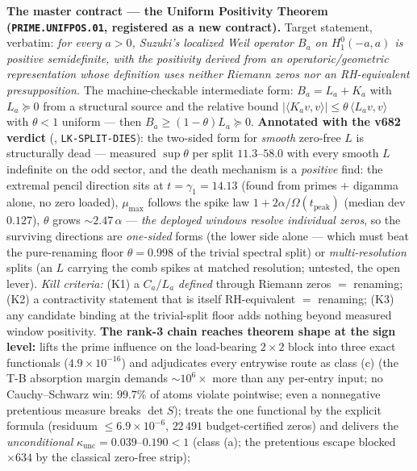 \textbf{The master contract --- the Uniform Positivity Theorem
(\texttt{PRIME.UNIFPOS.01}, registered as a new contract).}  Target
statement, verbatim: \emph{for every $a>0$, Suzuki's localized Weil
operator $B_a$ on $H^0_1(-a,a)$ is positive semidefinite, with the
positivity derived from an operatoric/geometric representation whose
definition uses neither Riemann zeros nor an RH-equivalent
presupposition.}  The machine-checkable intermediate form: $B_a=L_a
+K_a$ with $L_a\succeq0$ from a structural source and the relative
bound $|\langle K_av,v\rangle|\le\theta\,\langle L_av,v\rangle$ with
$\theta<1$ uniform --- then $B_a\ge(1-\theta)L_a\succeq0$.
\textbf{Annotated with the v682 verdict}
(, \texttt{LK-SPLIT-DIES}): the
two-sided form for \emph{smooth} zero-free $L$ is structurally dead
--- measured $\sup\theta$ per split $11.3$--$58.0$ with every smooth
$L$ indefinite on the odd sector, and the death mechanism is a
\emph{positive} find: the extremal pencil direction sits at
$t=\gamma_1=14.13$ (found from primes $+$ digamma alone, no zero
loaded), $\mu_{\max}$ follows the spike law $1+2\alpha/\Omega
(t_{\mathrm{peak}})$ (median dev $0.127$), $\theta$ grows
$\sim2.47\,\alpha$ --- \emph{the deployed windows resolve individual
zeros}, so the surviving directions are \emph{one-sided} forms (the
lower side alone --- which must beat the pure-renaming floor
$\theta=0.998$ of the trivial spectral split) or
\emph{multi-resolution} splits (an $L$ carrying the comb spikes at
matched resolution; untested, the open lever).  \emph{Kill criteria:}
(K1) a $C_a$/$L_a$ \emph{defined} through Riemann zeros $=$ renaming;
(K2) a contractivity statement that is itself RH-equivalent $=$
renaming; (K3) any candidate binding at the trivial-split floor adds
nothing beyond measured window positivity.  \textbf{The rank-3 chain
reaches theorem shape at the sign level:}
 lifts the prime influence on the
load-bearing $2\times2$ block into three exact functionals
($4.9\times10^{-16}$) and adjudicates every entrywise route as class
(c) (the T-B absorption margin demands $\sim10^{6}\times$ more than
any per-entry input; no Cauchy--Schwarz win: $99.7\%$ of atoms
violate pointwise; even a nonnegative pretentious measure breaks
$\det S$);  treats the one functional
by the explicit formula (residuum $\le6.9\times10^{-6}$, $22\,491$
budget-certified zeros) and delivers the \emph{unconditional}
$\kappa_{\mathrm{unc}}=0.039$--$0.190<1$ (class (a); the pretentious
escape blocked $\times634$ by the classical zero-free strip);
